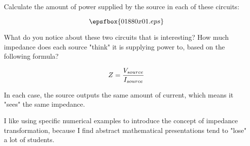 

Calculate the amount of power supplied by the source in each of these circuits:

$$\epsfbox{01880x01.eps}$$

What do you notice about these two circuits that is interesting?  How much impedance does each source "think" it is supplying power to, based on the following formula?

$$Z = {V_{source} \over I_{source}}$$







In each case, the source outputs the same amount of current, which means it "sees" the same impedance.







I like using specific numerical examples to introduce the concept of impedance transformation, because I find abstract mathematical presentations tend to "lose" a lot of students.




